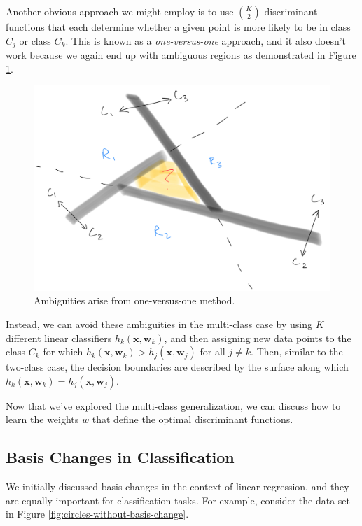 Another obvious approach we might employ is to use $\binom{K}{2}$ discriminant functions that each determine whether a given point is more likely to be in class $C_{j}$ or class $C_{k}$. This is known as a \textit{one-versus-one} approach, and it also doesn't work because we again end up with ambiguous regions as demonstrated in Figure \ref{fig:one-vs-one-ambig}.

\begin{figure}
    \centering
    \includegraphics[width=0.5\paperwidth]{../Classification/fig/one_vs_one_ambig_ipad.jpg}
    \caption{Ambiguities arise from one-versus-one method.}
    \label{fig:one-vs-one-ambig}
\end{figure}

Instead, we can avoid these ambiguities in the multi-class case by using $K$ different linear classifiers $h_{k}(\textbf{x}, \textbf{w}_{k})$, and then assigning new data points to the class $C_{k}$ for which $h_{k}(\textbf{x}, \textbf{w}_{k}) > h_{j}(\textbf{x}, \textbf{w}_{j})$ for all $j \neq k$. Then, similar to the two-class case, the decision boundaries are described by the surface along which $h_{k}(\textbf{x}, \textbf{w}_{k}) = h_{j}(\textbf{x}, \textbf{w}_{j})$.

Now that we've explored the multi-class generalization, we can discuss how to learn the weights $w$ that define the optimal discriminant functions.

\subsection{Basis Changes in Classification}
We initially discussed basis changes in the context of linear regression, and they are equally important for classification tasks. For example, consider the data set in Figure \ref{fig:circles-without-basis-change}.

